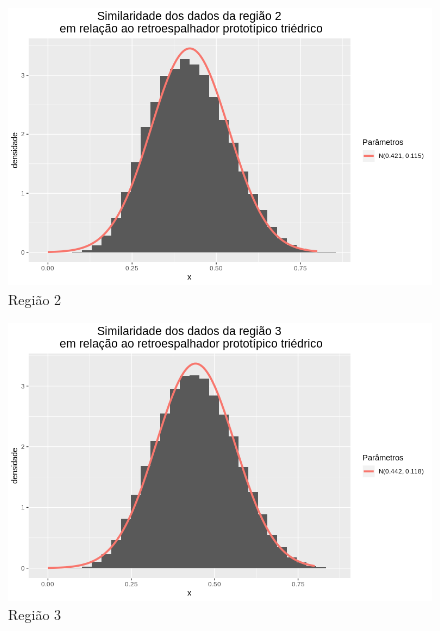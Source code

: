 \documentclass[12pt]{article}
\begin{document}
\begin{figure}[!h]
    \centering
    \vspace{0.1\linewidth}
    \includegraphics[width = 0.95\linewidth]{../../Images/Report_18_12_17/tri_region2.png}
    \caption{Região 2}
    \label{fig:tri_r2}
\end{figure}

\begin{figure}[!h]
    \centering
    \vspace{0.15\linewidth}
    \includegraphics[width = 0.95\linewidth]{../../Images/Report_18_12_17/tri_region3.png}
    \caption{Região 3}
    \label{fig:tri_r3}
\end{figure}
\end{document}
